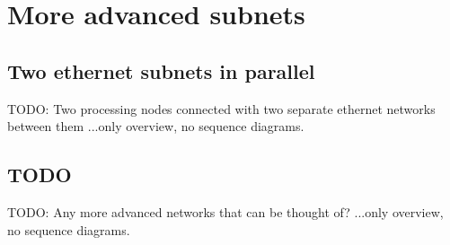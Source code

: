 \section{More advanced subnets}
\subsection{Two ethernet subnets in parallel}
TODO: Two processing nodes connected with two separate ethernet networks
between them ...only overview, no sequence diagrams.

\subsection{TODO}
TODO: Any more advanced networks that can be thought of? ...only overview, no
sequence diagrams.
